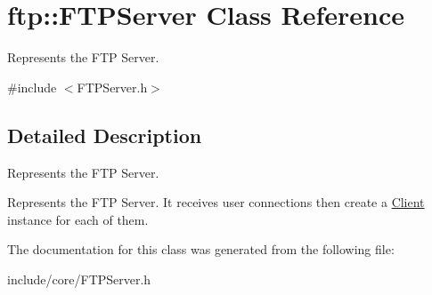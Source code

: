 \hypertarget{classftp_1_1_f_t_p_server}{\section{ftp\-:\-:F\-T\-P\-Server Class Reference}
\label{classftp_1_1_f_t_p_server}
}


Represents the F\-T\-P Server.  




{\ttfamily \#include $<$F\-T\-P\-Server.\-h$>$}



\subsection{Detailed Description}
Represents the F\-T\-P Server. 

Represents the F\-T\-P Server. It receives user connections then create a \hyperlink{classftp_1_1_client}{Client} instance for each of them. 

The documentation for this class was generated from the following file\-:\begin{DoxyCompactItemize}
\item 
include/core/F\-T\-P\-Server.\-h\end{DoxyCompactItemize}
